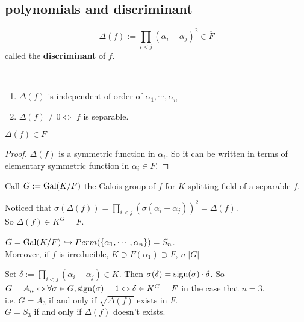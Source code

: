 \subsection{polynomials and discriminant}
\begin{definition}
    \[\Delta(f):=\prod\limits_{i<j}(\alpha_i-\alpha_j)^2\in \overline{F}\]
    called the \textbf{discriminant} of  $ f  $.
\end{definition}
\begin{note}
    \,
    \begin{enumerate}[(1)]
        \item  $ \Delta(f)  $ is independent of order of  $ \alpha_1,\cdots,\alpha_n $\\
        \item  $ \Delta(f)\not=0\Leftrightarrow  $   $ f  $ is separable. 
    \end{enumerate}
\end{note}
\begin{proposition}
     $ \Delta(f)\in F $ 
\end{proposition}
\begin{proof}
     $ \Delta(f)  $ is a symmetric function in  $ \alpha_i $. So it can be written in terms of elementary symmetric function in   $ \alpha_i\in F $. 
\end{proof}
\begin{definition}
    Call  $ G:=\operatorname{Gal}(K/F ) $ the Galois group of  $ f  $ for  $ K  $ splitting field of a separable  $ f  $. 
\end{definition}
Noticed that  $ \sigma(\Delta(f))=\prod\limits_{i<j}(\sigma(\alpha_i-\alpha_j))^2=\Delta(f) $.\\
So  $ \Delta(f)\in K^G=F $.
\begin{proposition}
     $ G=\operatorname{Gal}(K/F)\hookrightarrow Perm(\{\alpha_1,\cdots,\alpha_n\})=S_n $.\\
     Moreover, if  $ f  $ is irreducible,  $ K\supset F(\alpha_1)\supset F  $,  $ n|\left|G\right| $  
\end{proposition}  
Set  $ \delta:=\prod\limits_{i<j}(\alpha_i-\alpha_j)\in K $. Then  $ \sigma(\delta)=\operatorname{sign}(\sigma)\cdot\delta $.
So  $ G=A_n\Leftrightarrow  \forall \sigma\in G,\operatorname{sign}(\sigma)=1\Leftrightarrow  \delta\in K^G=F  $ in the case that  $ n=3 $. \\
i.e.  $ G=A_3 $ if and only if  $ \sqrt{\Delta(f)} $ exists in  $ F  $.\\
 $ G=S_3  $ if and only if  $ \Delta(f)  $ doesn't exists.\\

